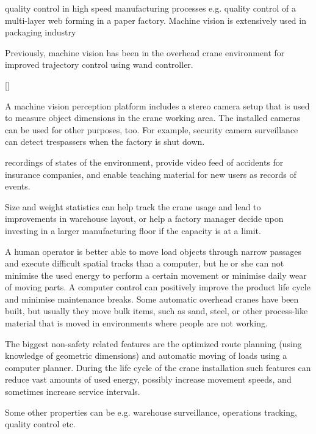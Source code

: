 \documentclass[12pt,a4paper,oneside,pdftex]{report}
\begin{document}
quality control in high speed manufacturing processes e.g. quality control of a multi-layer web forming in a paper factory. Machine vision is extensively used in packaging industry






Previously, machine vision has been  in the overhead crane environment for improved trajectory control using wand controller. 

\ref{}

A machine vision perception platform includes a stereo camera setup that is used to measure object dimensions in the crane working area. The installed cameras can be used for other purposes, too. For example, security camera surveillance can detect trespassers when the factory is shut down. 

recordings of states of the environment, provide video feed of accidents for insurance companies, and enable teaching material for new users as records of events. 



Size and weight statistics can help track the crane usage and lead to improvements in warehouse layout, or help a factory manager decide upon investing in a larger manufacturing floor if the capacity is at a limit.

A human operator is better able to move load objects through narrow passages and execute difficult spatial tracks than a computer, but he or she can not minimise the used energy to perform a certain movement or minimise daily wear of moving parts. A computer control can positively improve the product life cycle and minimise maintenance breaks. 
Some automatic overhead cranes have been built, but usually they move bulk items, such as sand, steel, or other process-like material that is moved in environments where people are not working.




The biggest non-safety related features are the optimized route planning (using knowledge of geometric dimensions) and automatic moving of loads using a computer planner. During the life cycle of the crane installation such features can reduce vast amounts of used energy, possibly increase movement speeds, and sometimes increase service intervals.
 
 
 
 Some other properties can be e.g. warehouse surveillance, operations tracking, quality control etc.
 
\end{document}
